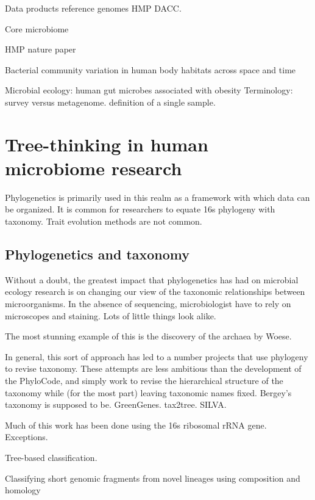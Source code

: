 \documentclass{amsart}
\begin{document}
Data products
reference genomes
HMP DACC.

Core microbiome
\cite{turnbaugh2008core}


HMP nature paper
\cite{methe2012framework}


\cite{costello2009bacterial}
Bacterial community variation in human body habitats across space and time

\cite{ley2006microbial}
Microbial ecology: human gut microbes associated with obesity
Terminology: survey versus metagenome.
definition of a single sample.

\section{Tree-thinking in human microbiome research}

Phylogenetics is primarily used in this realm as a framework with which data can be organized.
It is common for researchers to equate 16s phylogeny with taxonomy.
Trait evolution methods are not common.

\subsection{Phylogenetics and taxonomy}

Without a doubt, the greatest impact that phylogenetics has had on microbial ecology research is on changing our view of the taxonomic relationships between microorganisms.
In the absence of sequencing, microbiologist have to rely on microscopes and staining.
Lots of little things look alike.

The most stunning example of this is the discovery of the archaea by Woese.

In general, this sort of approach has led to a number projects that use phylogeny to revise taxonomy.
These attempts are less ambitious than the development of the PhyloCode, and simply work to revise the hierarchical structure of the taxonomy while (for the most part) leaving taxonomic names fixed.
Bergey's taxonomy is supposed to be.
GreenGenes.
tax2tree.
SILVA.

Much of this work has been done using the 16s ribosomal rRNA gene.
Exceptions.

Tree-based classification.

\cite{parks2011classifying}
Classifying short genomic fragments from novel lineages using composition and homology
\end{document}
